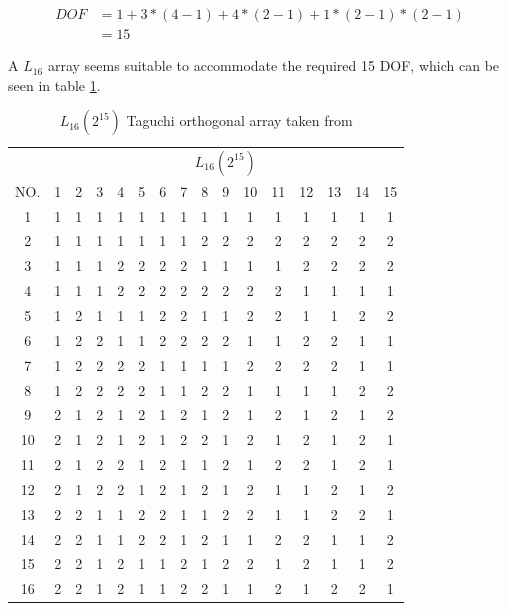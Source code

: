 \begin{equation} \label{equ:hyperparam_tuning:DOF}
	\begin{split}
		DOF & = 1 + 3 * (4 - 1) + 4 * (2 - 1) + 1 * (2 - 1) * (2 - 1) \\
		& = 15
	\end{split}
\end{equation}

A $L_{16}$ array seems suitable to accommodate the required 15 DOF, which can be seen in table \ref{tab:hyperparameter_tuning:L16_orhtogonal_array}.

\begin{table}[ht]
	\label{tab:hyperparameter_tuning:L16_orhtogonal_array}
	\centering
\begin{tabular}{ |c||c|c|c|c|c|c|c|c|c|c|c|c|c|c|c|  }
	\hline
	   & \multicolumn{15}{c|}{ $L_{16}(2^{15})$ } \\
	NO.& 1 & 2 & 3 & 4 & 5 & 6 & 7 & 8 & 9 & 10& 11& 12& 13& 14&15\\
	\hline
	1  & 1 & 1 & 1 & 1 & 1 & 1 & 1 & 1 & 1 & 1 & 1 & 1 & 1 & 1 & 1\\
	2  & 1 & 1 & 1 & 1 & 1 & 1 & 1 & 2 & 2 & 2 & 2 & 2 & 2 & 2 & 2\\
	3  & 1 & 1 & 1 & 2 & 2 & 2 & 2 & 1 & 1 & 1 & 1 & 2 & 2 & 2 & 2\\
	4  & 1 & 1 & 1 & 2 & 2 & 2 & 2 & 2 & 2 & 2 & 2 & 1 & 1 & 1 & 1\\
	5  & 1 & 2 & 1 & 1 & 1 & 2 & 2 & 1 & 1 & 2 & 2 & 1 & 1 & 2 & 2\\
	6  & 1 & 2 & 2 & 1 & 1 & 2 & 2 & 2 & 2 & 1 & 1 & 2 & 2 & 1 & 1\\
	7  & 1 & 2 & 2 & 2 & 2 & 1 & 1 & 1 & 1 & 2 & 2 & 2 & 2 & 1 & 1\\
	8  & 1 & 2 & 2 & 2 & 2 & 1 & 1 & 2 & 2 & 1 & 1 & 1 & 1 & 2 & 2\\
	9  & 2 & 1 & 2 & 1 & 2 & 1 & 2 & 1 & 2 & 1 & 2 & 1 & 2 & 1 & 2\\
	10 & 2 & 1 & 2 & 1 & 2 & 1 & 2 & 2 & 1 & 2 & 1 & 2 & 1 & 2 & 1\\
	11 & 2 & 1 & 2 & 2 & 1 & 2 & 1 & 1 & 2 & 1 & 2 & 2 & 1 & 2 & 1\\
	12 & 2 & 1 & 2 & 2 & 1 & 2 & 1 & 2 & 1 & 2 & 1 & 1 & 2 & 1 & 2\\
	13 & 2 & 2 & 1 & 1 & 2 & 2 & 1 & 1 & 2 & 2 & 1 & 1 & 2 & 2 & 1\\
	14 & 2 & 2 & 1 & 1 & 2 & 2 & 1 & 2 & 1 & 1 & 2 & 2 & 1 & 1 & 2\\
	15 & 2 & 2 & 1 & 2 & 1 & 1 & 2 & 1 & 2 & 2 & 1 & 2 & 1 & 1 & 2\\
	16 & 2 & 2 & 1 & 2 & 1 & 1 & 2 & 2 & 1 & 1 & 2 & 1 & 2 & 2 & 1\\
	\hline
\end{tabular}
\caption{ $L_{16}(2^{15})$ Taguchi orthogonal array taken from \cite{roy_primer_1990}}
\end{table}

